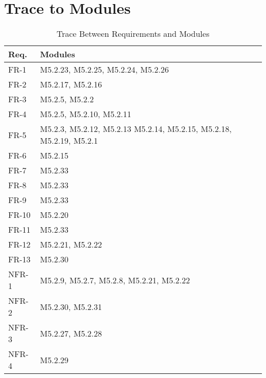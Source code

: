 \documentclass[12pt, titlepage]{article}
\begin{document}
\section{Trace to Modules}		
\begin{table}[hbt!]
\centering
\begin{tabular}{p{} p{}}
\toprule
\textbf{Req.} & \textbf{Modules}\\
\midrule
FR-1 & M5.2.23, M5.2.25, M5.2.24, M5.2.26\\
FR-2 & M5.2.17, M5.2.16\\
FR-3 & M5.2.5, M5.2.2\\
FR-4 & M5.2.5, M5.2.10, M5.2.11\\
FR-5 & M5.2.3, M5.2.12, M5.2.13 M5.2.14, M5.2.15, M5.2.18,
M5.2.19, M5.2.1\\
FR-6 & M5.2.15\\
FR-7 & M5.2.33\\
FR-8 & M5.2.33\\
FR-9 & M5.2.33\\
FR-10 & M5.2.20\\
FR-11 & M5.2.33\\
FR-12 & M5.2.21, M5.2.22\\
FR-13 & M5.2.30 \\

NFR-1 & M5.2.9, M5.2.7, M5.2.8, M5.2.21, M5.2.22\\
NFR-2 & M5.2.30, M5.2.31\\
NFR-3 & M5.2.27, M5.2.28\\
NFR-4 & M5.2.29\\
\bottomrule
\end{tabular}
\caption{Trace Between Requirements and Modules}
\label{TblRT}
\end{table}

\newpage
\end{document}
